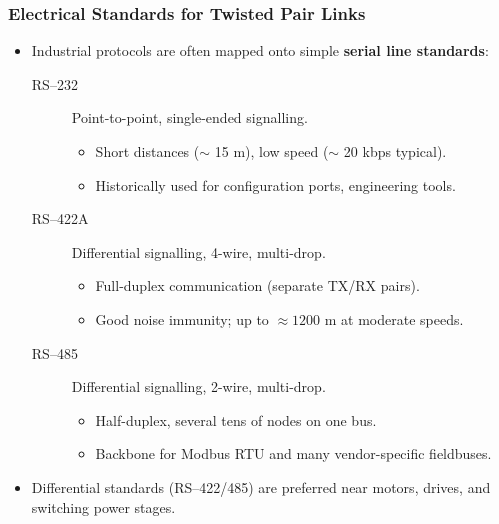 \begin{frame}
	\frametitle{Electrical Standards for Twisted Pair Links}
	\small
	\begin{itemize}
		\item Industrial protocols are often mapped onto simple \textbf{serial line standards}:
		\begin{description}
			\item[RS--232] Point-to-point, single-ended signalling.
			\begin{itemize}
				\item Short distances ($\sim$ 15 m), low speed ($\sim$ 20 kbps typical).
				\item Historically used for configuration ports, engineering tools.
			\end{itemize}
			\item[RS--422A] Differential signalling, 4-wire, multi-drop.
			\begin{itemize}
				\item Full-duplex communication (separate TX/RX pairs).
				\item Good noise immunity; up to $\approx 1200$ m at moderate speeds.
			\end{itemize}
			\item[RS--485] Differential signalling, 2-wire, multi-drop.
			\begin{itemize}
				\item Half-duplex, several tens of nodes on one bus.
				\item Backbone for Modbus RTU and many vendor-specific fieldbuses.
			\end{itemize}
		\end{description}
		\item Differential standards (RS--422/485) are preferred near motors, drives, and switching power stages.
	\end{itemize}
\end{frame}

